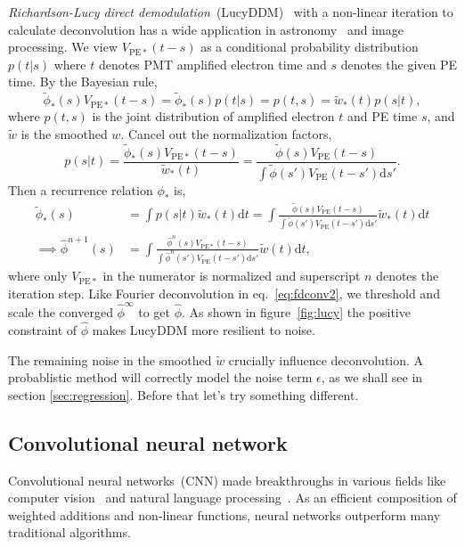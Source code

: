 \textit{Richardson-Lucy direct demodulation}~(LucyDDM)~\cite{lucy_iterative_1974} with a non-linear iteration to calculate deconvolution has a wide application in astronomy~\cite{li_richardson-lucy_2019} and image processing. We view $V_{\mathrm{PE}*}(t-s)$ as a conditional probability distribution $p(t|s)$ where $t$ denotes PMT amplified electron time and $s$ denotes the given PE time. By the Bayesian rule,
\begin{equation}
  \label{eq:lucy}
  \tilde{\phi}_*(s) V_{\mathrm{PE}*}(t-s) = \tilde{\phi}_*(s)p(t|s) = p(t,s) = \tilde{w}_*(t)p(s|t),
\end{equation}
where $p(t, s)$ is the joint distribution of amplified electron $t$ and PE time $s$, and $\tilde{w}$ is the smoothed $w$.  Cancel out the normalization factors,
\begin{equation}
  \label{eq:ptt}
  p(s|t) = \frac{\tilde{\phi}_*(s) V_{\mathrm{PE}*}(t-s)}{\tilde{w}_*(t)} = \frac{\tilde{\phi}(s) V_{\mathrm{PE}}(t-s)}{\int\tilde{\phi}(s') V_{\mathrm{PE}}(t-s')\mathrm{d}s'}.
\end{equation}
Then a recurrence relation $\phi_*$ is,
\begin{equation}
  \label{eq:iter}
  \begin{aligned}
    \tilde{\phi}_*(s) & = \int p(s|t) \tilde{w}_*(t)\mathrm{d}t = \int \frac{\tilde{\phi}(s) V_{\mathrm{PE}}(t-s)}{\int\tilde{\phi}(s') V_{\mathrm{PE}}(t-s')\mathrm{d}s'} \tilde{w}_*(t) \mathrm{d}t \\
    \implies \hat{\phi}^{n+1}(s) & = \int \frac{\hat{\phi}^n(s) V_{\mathrm{PE}*}(t-s)}{\int\hat{\phi}^n(s') V_{\mathrm{PE}}(t-s')\mathrm{d}s'} \tilde{w}(t) \mathrm{d}t,
  \end{aligned}
\end{equation}
where only $V_{\mathrm{PE}*}$ in the numerator is normalized and superscript $n$ denotes the iteration step.
Like Fourier deconvolution in eq.~\eqref{eq:fdconv2}, we threshold and scale the converged $\hat{\phi}^\infty$ to get $\hat{\phi}$.  As shown in figure~\ref{fig:lucy} the positive constraint of $\hat{\phi}$ makes LucyDDM more resilient to noise.

The remaining noise in the smoothed $\tilde{w}$ crucially influence deconvolution.  A probablistic method will correctly model the noise term $\epsilon$, as we shall see in section \ref{sec:regression}.  Before that let's try something different.

\subsection{Convolutional neural network}
\label{sec:cnn}
Convolutional neural networks~(CNN) made breakthroughs in various fields like computer vision~\cite{he_deep_2016} and natural language processing~\cite{vaswani_attention_2017}. As an efficient composition of weighted additions and non-linear functions, neural networks outperform many traditional algorithms.

